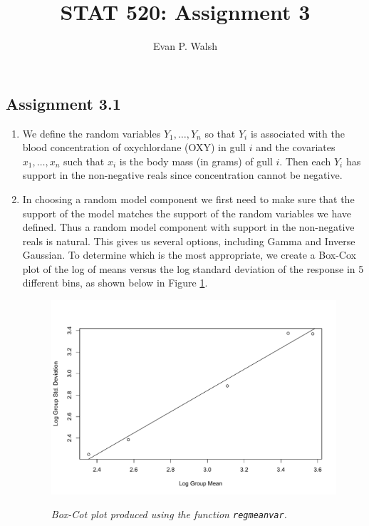 \documentclass[12pt]{article}
\title{STAT 520: Assignment 3}
\author{Evan P. Walsh}
\begin{document}


\subsection*{Assignment 3.1}

\begin{enumerate}
  \item We define the random variables $Y_{1}, \dots, Y_{n}$ so that $Y_i$ is associated with the blood concentration of oxychlordane (OXY) in gull
    $i$ and the covariates $x_{1}, \dots, x_{n}$ such that $x_{i}$ is the body mass (in grams) of gull $i$. Then each $Y_{i}$ has support in the non-negative
    reals since concentration cannot be negative.

  \item In choosing a random model component we first need to make sure that the support of the model matches the support of the random variables we
    have defined. Thus a random model component with support in the non-negative reals is natural. This gives us several options, including Gamma and
    Inverse Gaussian. To determine which is the most appropriate, we 
    create a Box-Cox plot of the log of means 
    versus the log standard deviation of the response in 5 different bins, as shown below in Figure \ref{fig:1}.

    \begin{figure}[h]
      \caption{\emph{Box-Cot plot produced using the function \texttt{regmeanvar}.}}
      \centering
      \includegraphics[width=.82\textwidth]{./figures/hw03_regmeanvar.pdf}
      \label{fig:1}
    \end{figure}


\end{enumerate}
\end{document}

